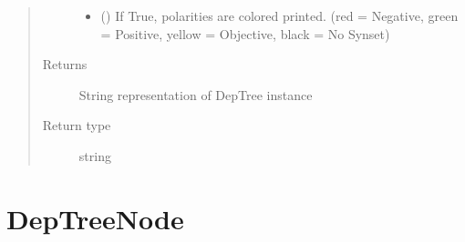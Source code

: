 \documentclass[letterpaper,10pt,english]{sphinxmanual}
\begin{document}
\begin{fulllineitems}
\begin{fulllineitems}
\begin{quote}
\begin{description}
\begin{itemize}
\item {} 
 () \textendash{} If True, polarities are colored printed.
(red = Negative, green = Positive, yellow = Objective, black = No Synset)

\end{itemize}

\item[{Returns}] \leavevmode
String representation of DepTree instance

\item[{Return type}] \leavevmode
string

\end{description}\end{quote}

\end{fulllineitems}


\end{fulllineitems}



\section{DepTreeNode}
\label{\detokenize{classes:deptreenode}}
\end{document}

